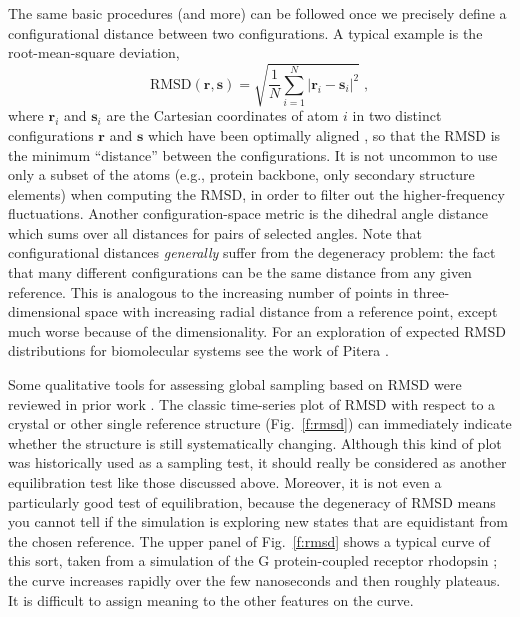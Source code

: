The same basic procedures (and more) can be followed once we precisely define a configurational distance between two configurations.  A typical example is the root-mean-square deviation,
\begin{equation}
\label{eq:rmsd}
\mathrm{RMSD}(\mathbf{r}, \mathbf{s}) = \sqrt{\frac{1}{N}\sum_{i=1}^{N} \left| \mathbf{r}_i - \mathbf{s}_i \right|^2} \;,
\end{equation}
where $\mathbf{r}_i$ and $\mathbf{s}_i$ are the Cartesian coordinates of atom $i$ in two distinct configurations $\mathbf{r}$ and $\mathbf{s}$ which have been optimally aligned \cite{Kabsch1976}, so that the RMSD is the minimum ``distance'' between the configurations. 
It is not uncommon to use only a subset of the atoms (e.g., protein backbone, only secondary structure elements) when computing the RMSD, in order to filter out the higher-frequency fluctuations.
Another configuration-space metric is the dihedral angle distance which sums over all distances for pairs of selected angles.
Note that configurational distances \emph{generally} suffer from the degeneracy problem: the fact that many different configurations can be the same distance from any given reference.  This is analogous to
the increasing number of points in three-dimensional space
with increasing radial distance from a reference point, except
much worse because of the dimensionality.  For an
exploration of expected RMSD distributions for biomolecular
systems see the work of Pitera \cite{Pitera2014}.


Some qualitative tools for assessing global sampling based on RMSD were reviewed
in prior work \cite{Grossfield2009}.   The classic time-series plot of RMSD with
respect to a crystal or other single reference structure (Fig.\ \ref{f:rmsd}) can immediately
indicate whether the structure is still systematically changing.  Although this
kind of plot was historically used as a sampling test, it should really be
considered as another equilibration test like those discussed above.  Moreover,
it is not even a particularly good test of equilibration, because the degeneracy
of RMSD means you cannot tell if the simulation is exploring new states that are
equidistant from the chosen reference.  The upper panel of Fig.\ \ref{f:rmsd}
shows a typical curve of this sort, taken from a simulation of the G
protein-coupled receptor rhodopsin \cite{Grossfield-2015}; the curve increases
rapidly over the few nanoseconds and then roughly plateaus.  It is difficult to
assign meaning to the other features on the curve.

